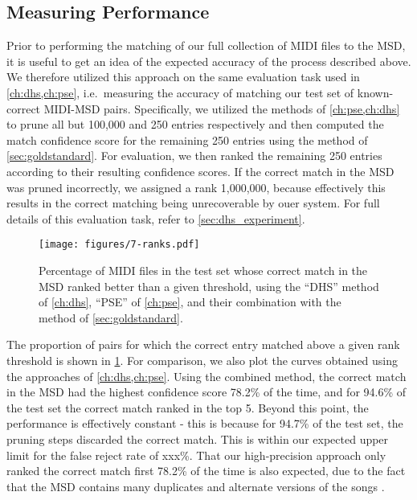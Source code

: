 \subsection{Measuring Performance}

Prior to performing the matching of our full collection of MIDI files to the MSD, it is useful to get an idea of the expected accuracy of the process described above.
We therefore utilized this approach on the same evaluation task used in \cref{ch:dhs,ch:pse}, i.e.\ measuring the accuracy of matching our test set of known-correct MIDI-MSD pairs.
Specifically, we utilized the methods of \cref{ch:pse,ch:dhs} to prune all but 100,000 and 250 entries respectively and then computed the match confidence score for the remaining 250 entries using the method of \cref{sec:goldstandard}.
For evaluation, we then ranked the remaining 250 entries according to their resulting confidence scores.
If the correct match in the MSD was pruned incorrectly, we assigned a rank 1,000,000, because effectively this results in the correct matching being unrecoverable by ouer system.
For full details of this evaluation task, refer to \cref{sec:dhs_experiment}.

\begin{figure}
  \texttt{[image: figures/7-ranks.pdf]}
  \caption[Percentage of the test set below a given rank]{Percentage of MIDI files in the test set whose correct match in the MSD ranked better than a given threshold, using the ``DHS'' method of \cref{ch:dhs}, ``PSE'' of \cref{ch:pse}, and their combination with the method of \cref{sec:goldstandard}.}
  \label{fig:combined_ranks}
\end{figure}

The proportion of pairs for which the correct entry matched above a given rank threshold is shown in \cref{fig:combined_ranks}.
For comparison, we also plot the curves obtained using the approaches of \cref{ch:dhs,ch:pse}.
Using the combined method, the correct match in the MSD had the highest confidence score 78.2\% of the time, and for 94.6\% of the test set the correct match ranked in the top 5.
Beyond this point, the performance is effectively constant - this is because for 94.7\% of the test set, the pruning steps discarded the correct match.
This is within our expected upper limit for the false reject rate of xxx\%.
That our high-precision approach only ranked the correct match first 78.2\% of the time is also expected, due to the fact that the MSD contains many duplicates and alternate versions of the songs \cite{bertin2012large}.

